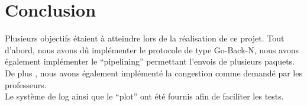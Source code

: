 \documentclass[a4paper,10pt]{article}
\begin{document}
\section{Conclusion}
Plusieurs objectifs étaient à atteindre lors de la réalisation de ce projet. Tout d'abord, nous avons dû implémenter le 
protocole de type Go-Back-N, nous avons également implémenter le ``pipelining'' permettant l'envois de plusieurs paquets.
De plus , nous avons également implémenté la congestion comme demandé par les professeurs.\\

Le système de log ainsi que le ``plot'' ont été fournis afin de faciliter les tests.
\end{document}

